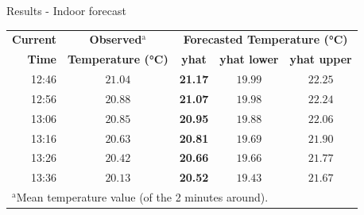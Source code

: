\documentclass{beamer}
\begin{document}
\begin{frame}{Results - Indoor forecast}

	\begin{table}[htbp]\small
		\begin{center}
			\begin{tabular}{|r||c||c|c|c|}
				\hline
				\textbf{Current} & \textbf{Observed}$^{\mathrm{a}}$ & \multicolumn{3}{|c|}{\textbf{Forecasted Temperature (°C)}} \\
				\cline{3-5}
				\textbf{Time} & \textbf{Temperature (°C)} & \textbf{yhat} & \textbf{yhat lower} & \textbf{yhat upper} \\
				\hline
				\hline
				12:46 & $21.04$ & \textbf{21.17} & $19.99$ & $22.25$ \\
				\hline
				12:56 & $20.88$ & \textbf{21.07} & $19.98$ & $22.24$ \\
				\hline
				13:06 & $20.85$ & \textbf{20.95} & $19.88$ & $22.06$ \\
				\hline
				13:16 & $20.63$ & \textbf{20.81} & $19.69$ & $21.90$ \\
				\hline
				13:26 & $20.42$ & \textbf{20.66} & $19.66$ & $21.77$ \\
				\hline
				13:36 & $20.13$ & \textbf{20.52} & $19.43$ & $21.67$ \\
				\hline
				\multicolumn{4}{l}{$^{\mathrm{a}}$Mean temperature value (of the 2 minutes around).}
			\end{tabular}
			\label{tab_forecast_indoor}
		\end{center}
	\end{table}
\end{frame}
\end{document}
